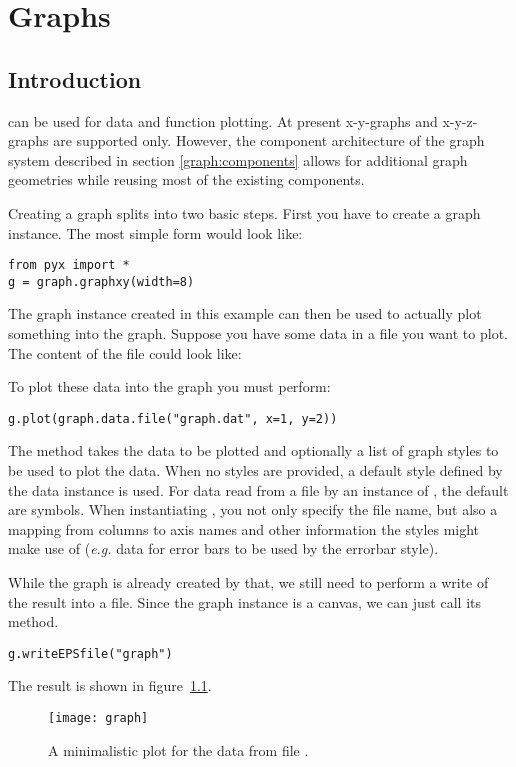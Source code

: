 \chapter{Graphs}
\label{graph}

\section{Introduction} %
\PyX{} can be used for data and function plotting. At present
x-y-graphs and x-y-z-graphs are supported only. However, the component
architecture of the graph system described in section
\ref{graph:components} allows for additional graph geometries while
reusing most of the existing components.

Creating a graph splits into two basic steps. First you have to create
a graph instance. The most simple form would look like:
\begin{verbatim}
from pyx import *
g = graph.graphxy(width=8)
\end{verbatim}
The graph instance  created in this example can then be used
to actually plot something into the graph. Suppose you have some data
in a file  you want to plot. The content of the file
could look like:

To plot these data into the graph  you must perform:
\begin{verbatim}
g.plot(graph.data.file("graph.dat", x=1, y=2))
\end{verbatim}
The method  takes the data to be plotted and optionally
a list of graph styles to be used to plot the data. When no styles are
provided, a default style defined by the data instance is used. For
data read from a file by an instance of , the
default are symbols. When instantiating , you
not only specify the file name, but also a mapping from columns to
axis names and other information the styles might make use of
(\emph{e.g.} data for error bars to be used by the errorbar style).

While the graph is already created by that, we still need to perform a
write of the result into a file. Since the graph instance is a canvas,
we can just call its  method.
\begin{verbatim}
g.writeEPSfile("graph")
\end{verbatim}
The result  is shown in figure~\ref{fig:graph}.

\begin{figure}[ht]
\centerline{\texttt{[image: graph]}}
\caption[A minimalistic plot for the data from a file.]{A minimalistic plot for the data from file .}
\label{fig:graph}
\end{figure}


